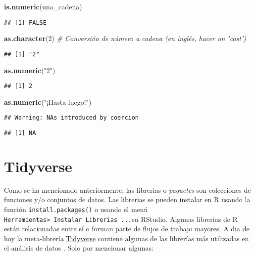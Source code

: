 \documentclass[
]{book}
\newenvironment{Shaded}{\begin{snugshade}}{\end{snugshade}}
\newcommand{\CommentTok}[1]{\textcolor[rgb]{0.56,0.35,0.01}{\textit{#1}}}
\newcommand{\DecValTok}[1]{\textcolor[rgb]{0.00,0.00,0.81}{#1}}
\newcommand{\KeywordTok}[1]{\textcolor[rgb]{0.13,0.29,0.53}{\textbf{#1}}}
\newcommand{\NormalTok}[1]{#1}
\newcommand{\StringTok}[1]{\textcolor[rgb]{0.31,0.60,0.02}{#1}}
\begin{document}
\begin{Shaded}
\begin{Highlighting}[]
\KeywordTok{is.numeric}\NormalTok{(una_cadena)}
\end{Highlighting}
\end{Shaded}

\begin{verbatim}
## [1] FALSE
\end{verbatim}

\begin{Shaded}
\begin{Highlighting}[]
\KeywordTok{as.character}\NormalTok{(}\DecValTok{2}\NormalTok{) }\CommentTok{# Conversión de número a cadena (en inglés, hacer un 'cast')}
\end{Highlighting}
\end{Shaded}

\begin{verbatim}
## [1] "2"
\end{verbatim}

\begin{Shaded}
\begin{Highlighting}[]
\KeywordTok{as.numeric}\NormalTok{(}\StringTok{"2"}\NormalTok{)}
\end{Highlighting}
\end{Shaded}

\begin{verbatim}
## [1] 2
\end{verbatim}

\begin{Shaded}
\begin{Highlighting}[]
\KeywordTok{as.numeric}\NormalTok{(}\StringTok{"¡Hasta luego!"}\NormalTok{)}
\end{Highlighting}
\end{Shaded}

\begin{verbatim}
## Warning: NAs introduced by coercion
\end{verbatim}

\begin{verbatim}
## [1] NA
\end{verbatim}

\hypertarget{tidyverse}{%
\section{Tidyverse}\label{tidyverse}}

Como se ha mencionado anteriormente, las librerias o \emph{paquetes} son colecciones de funciones y/o conjuntos de datos. Las librerias se pueden instalar en R usando la función \texttt{install.packages()} o usando el menú \texttt{Herramientas\textgreater{}\ Instalar\ Librerias\ ...}en RStudio.
Algunas librerias de R están relacionadas entre sí o forman parte de flujos de trabajo mayores. A dia de hoy la meta-librería \href{https://www.tidyverse.org/}{Tidyverse} contiene algunas de las librerías más utilizadas en el análisis de datos \citep{wickham2019tidyverse}. Solo por mencionar algunas:
\end{document}
